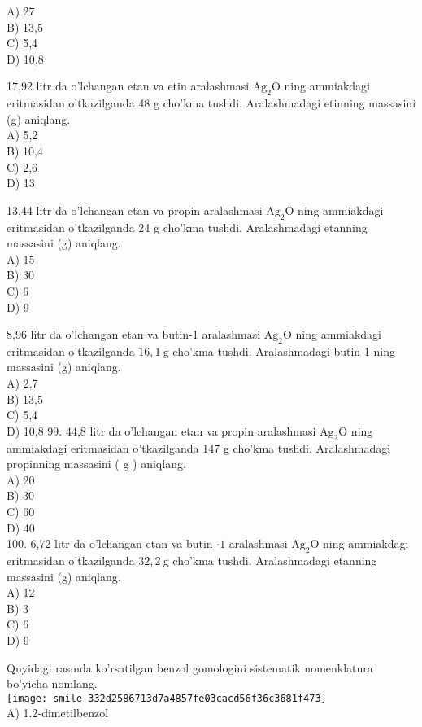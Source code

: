 A) 27\\
B) 13,5\\
C) 5,4\\
D) 10,8
  \item 17,92 litr da o'lchangan etan va etin aralashmasi $\mathrm{Ag}_{2} \mathrm{O}$ ning ammiakdagi eritmasidan o'tkazilganda 48 g cho'kma tushdi. Aralashmadagi etinning massasini (g) aniqlang.\\
A) 5,2\\
B) 10,4\\
C) 2,6\\
D) 13
  \item 13,44 litr da o'lchangan etan va propin aralashmasi $\mathrm{Ag}_{2} \mathrm{O}$ ning ammiakdagi eritmasidan o'tkazilganda 24 g cho'kma tushdi. Aralashmadagi etanning massasini (g) aniqlang.\\
A) 15\\
B) 30\\
C) 6\\
D) 9
  \item 8,96 litr da o'lchangan etan va butin-1 aralashmasi $\mathrm{Ag}_{2} \mathrm{O}$ ning ammiakdagi eritmasidan o'tkazilganda $16,1 \mathrm{~g}$ cho'kma tushdi. Aralashmadagi butin-1 ning massasini (g) aniqlang.\\
A) 2,7\\
B) 13,5\\
C) 5,4\\
D) 10,8
99. 44,8 litr da o'lchangan etan va propin aralashmasi $\mathrm{Ag}_{2} \mathrm{O}$ ning ammiakdagi eritmasidan o'tkazilganda 147 g cho'kma tushdi. Aralashmadagi propinning massasini ( g ) aniqlang.\\
A) 20\\
B) 30\\
C) 60\\
D) 40\\
100. 6,72 litr da o'lchangan etan va butin $\cdot 1$ aralashmasi $\mathrm{Ag}_{2} \mathrm{O}$ ning ammiakdagi eritmasidan o'tkazilganda $32,2 \mathrm{~g}$ cho'kma tushdi. Aralashmadagi etanning massasini (g) aniqlang.\\
A) 12\\
B) 3\\
C) 6\\
D) 9
  \item Quyidagi rasmda ko'rsatilgan benzol gomologini sistematik nomenklatura bo'yicha nomlang.\\
\texttt{[image: smile-332d2586713d7a4857fe03cacd56f36c3681f473]}\\
A) 1.2-dimetilbenzol\\
